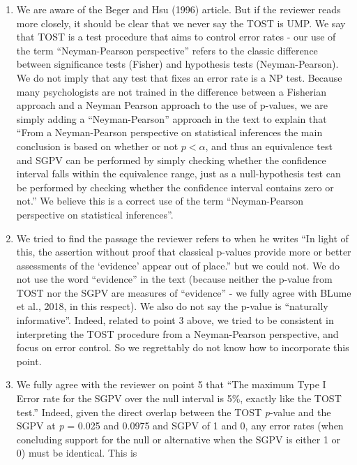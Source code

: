 \documentclass[man]{apa6}
\begin{document}
\begin{enumerate}
\def\labelenumi{\arabic{enumi}.}
\setcounter{enumi}{2}
\item
  We are aware of the Beger and Hsu (1996) article. But if the reviewer
  reads more closely, it should be clear that we never say the TOST is
  UMP. We say that TOST is a test procedure that aims to control error
  rates - our use of the term \enquote{Neyman-Pearson perspective}
  refers to the classic difference between significance tests (Fisher)
  and hypothesis tests (Neyman-Pearson). We do not imply that any test
  that fixes an error rate is a NP test. Because many psychologists are
  not trained in the difference between a Fisherian approach and a
  Neyman Pearson approach to the use of p-values, we are simply adding a
  \enquote{Neyman-Pearson} approach in the text to explain that
  \enquote{From a Neyman-Pearson perspective on statistical inferences
  the main conclusion is based on whether or not \(p < \alpha\), and
  thus an equivalence test and SGPV can be performed by simply checking
  whether the confidence interval falls within the equivalence range,
  just as a null-hypothesis test can be performed by checking whether
  the confidence interval contains zero or not.} We believe this is a
  correct use of the term \enquote{Neyman-Pearson perspective on
  statistical inferences}.
\item
  We tried to find the passage the reviewer refers to when he writes
  \enquote{In light of this, the assertion without proof that classical
  p-values provide more or better assessments of the \enquote{evidence}
  appear out of place.} but we could not. We do not use the word
  \enquote{evidence} in the text (because neither the p-value from TOST
  nor the SGPV are measures of \enquote{evidence} - we fully agree with
  BLume et al., 2018, in this respect). We also do not say the p-value
  is \enquote{naturally informative}. Indeed, related to point 3 above,
  we tried to be consistent in interpreting the TOST procedure from a
  Neyman-Pearson perspective, and focus on error control. So we
  regrettably do not know how to incorporate this point.
\item
  We fully agree with the reviewer on point 5 that \enquote{The maximum
  Type I Error rate for the SGPV over the null interval is 5\%, exactly
  like the TOST test.} Indeed, given the direct overlap between the TOST
  \emph{p}-value and the SGPV at \emph{p} = 0.025 and 0.0975 and SGPV of
  1 and 0, any error rates (when concluding support for the null or
  alternative when the SGPV is either 1 or 0) must be identical. This is

\end{enumerate}
\end{document}
